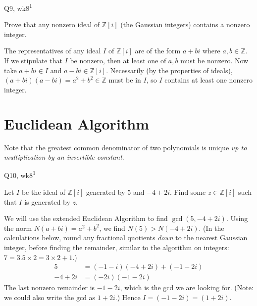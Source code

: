 \begin{problem}{Q9, wk8\textsuperscript{1}}{}


    Prove that any nonzero ideal of $\mathbb{Z}[i]$ (the Gaussian integers) contains a nonzero integer.

    \tcblower

    The representatives of any ideal $I$ of $\mathbb{Z}[i]$ are of the form $a + bi$ where $a, b \in \mathbb{Z}$. If we stipulate that $I$ be nonzero, then at least one of $a, b$ must be nonzero. Now take $a + bi \in I$ and $a - bi \in \mathbb{Z}[i]$. Necessarily (by the properties of ideals), $(a + bi)(a - bi) = a^2 + b^2 \in \mathbb{Z}$ must be in $I$, so $I$ contains at least one nonzero integer.

\end{problem}

\section{Euclidean Algorithm}

Note that the greatest common denominator of two polynomials is unique \textit{up to multiplication by an invertible constant}.

\begin{problem}{Q10, wk8\textsuperscript{1}}{}


    Let $I$ be the ideal of $\mathbb{Z}[i]$ generated by $5$ and $-4 + 2i$. Find some $z \in \mathbb{Z}[i]$ such that $I$ is generated by $z$.

    \tcblower

    We will use the extended Euclidean Algorithm to find $\gcd(5, -4 + 2i)$. Using the norm $N(a + bi) = a^2 + b^2$, we find $N(5) > N(-4 + 2i)$. (In the calculations below, round any fractional quotients \textit{down} to the nearest Gaussian integer, before finding the remainder, similar to the algorithm on integers: $7 = 3.5 \times 2 = 3 \times 2 + 1$.)
    \begin{align*}
        5 &= (-1-i)(-4 + 2i) + (-1 - 2i) \\
        -4 + 2i &= (-2i) (-1 - 2i)
    \end{align*}
    The last nonzero remainder is $-1 - 2i$, which is the gcd we are looking for. (Note: we could also write the gcd as $1 + 2i$.) Hence $I = (-1 - 2i) = (1 + 2i)$.

\end{problem}

